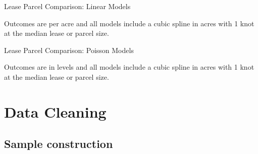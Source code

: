 \documentclass[12pt]{article}
\begin{document}
\begin{appendices}
\begin{table}[H]
\begin{center}
\begin{threeparttable}
	\caption{Lease Parcel Comparison: Linear Models}
	\label{tab:lease_parcel_linear}
 	\small
   	            
    \footnotesize
    \begin{tablenotes}
    	\item Outcomes are per acre and all models include a cubic spline in acres with 1 knot at the median lease or parcel size.  
    \end{tablenotes}
\end{threeparttable}
\end{center}
\end{table}

\begin{table}[H]
\begin{center}
\begin{threeparttable}
	\caption{Lease Parcel Comparison: Poisson Models}
	\label{tab:lease_parcel_poisson}
 	\small
   	            
    \footnotesize
    \begin{tablenotes}
    	\item Outcomes are in levels and all models include a cubic spline in acres with 1 knot at the median lease or parcel size.  
    \end{tablenotes}
\end{threeparttable}
\end{center}
\end{table}

\section{Data Cleaning \label{sec:DataCleaning}}

\subsection{Sample construction \label{sec:AppendixSampleConstruction}}


\end{appendices}
\end{document}
